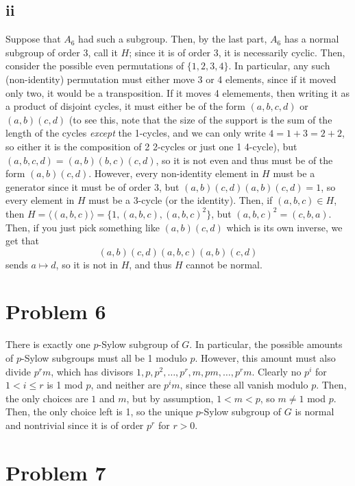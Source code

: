 \documentclass[12pt,letterpaper]{article}
\theoremstyle{definition}
\begin{document}
\subsection*{ii}

Suppose that $A_{6}$ had such a subgroup. Then, by the last part, $A_{6}$ has a normal subgroup of order 3, call it $H$; since it is of order 3, it is necessarily cyclic. Then, consider the possible even permutations of $\{1,2,3,4\}$. In particular, any such (non-identity) permutation must either move 3 or 4 elements, since if it moved only two, it would be a transposition. If it moves 4 elemements, then writing it as a product of disjoint cycles, it must either be of the form $(a,b,c,d)$ or $(a,b)(c,d)$ (to see this, note that the size of the support is the sum of the length of the cycles \textit{except} the 1-cycles, and we can only write $4 = 1 + 3 = 2 + 2$, so either it is the composition of 2 2-cycles or just one 1 4-cycle), but $(a,b,c,d) = (a,b)(b,c)(c,d)$, so it is not even and thus must be of the form $(a,b)(c,d)$. However, every non-identity element in $H$ must be a generator since it must be of order $3$, but $(a,b)(c,d)(a,b)(c,d) = 1$, so every element in $H$ must be a 3-cycle (or the identity). Then, if $(a,b,c) \in H$, then $H = \langle (a,b,c) \rangle = \{1, (a,b,c), (a,b,c)^{2}\}$, but $(a,b,c)^{2} = (c,b,a)$. Then, if you just pick something like $(a,b)(c,d)$ which is its own inverse, we get that
\[
  (a,b)(c,d)(a,b,c)(a,b)(c,d)
\]
sends $a \mapsto d$, so it is not in $H$, and thus $H$ cannot be normal.

\section*{Problem 6}

There is exactly one $p$-Sylow subgroup of $G$. In particular, the possible amounts of $p$-Sylow subgroups must all be 1 modulo $p$. However, this amount must also divide $p^{r}m$, which has divisors $1, p, p^{2}, \dots, p^{r}, m, pm, \dots, p^{r}m$. Clearly no $p^{i}$ for $1 < i \leq r$ is 1 mod $p$, and neither are $p^{i}m$, since these all vanish modulo $p$. Then, the only choices are $1$ and $m$, but by assumption, $1 < m < p$, so $m \neq 1$ mod $p$. Then, the only choice left is 1, so the unique $p$-Sylow subgroup of $G$ is normal and nontrivial since it is of order $p^{r}$ for $r > 0$.

\section*{Problem 7}
\end{document}
